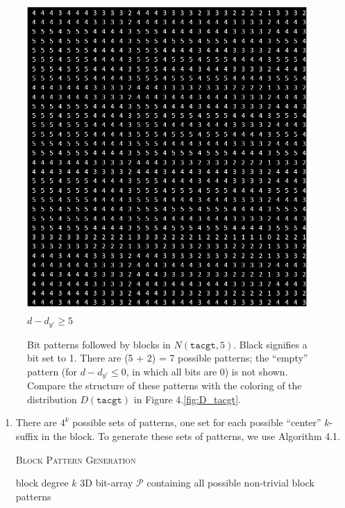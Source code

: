 \documentclass[oneside,12pt]{DISCSthesis}
\begin{document}
{\begin{figure}[h]
				\begin{minipage}{.33\textwidth} \centering \includegraphics[width=0.95\textwidth]{img/5} $d-d_{y'} \geq 5$ \end{minipage}
				\newline\newline
				\caption{
					Bit patterns followed by blocks in $N(\texttt{tacgt}, 5)$. Black signifies a bit set to 1. There are (5 + 2) = 7 possible patterns; the ``empty'' pattern (for $d - d_{y'} \leq 0$, in which all bits are 0) is not shown. Compare the structure of these patterns with the coloring of the distribution $D(\texttt{tacgt})$ in Figure 4.\ref{fig:D_tacgt}.
					}
			\end{figure}

		\begin{enumerate}
			\setcounter{enumi}{\theenumTemp}
			
			\item There are $4^k$ possible sets of patterns, one set for each possible ``center'' $k$-suffix in the block. To generate these sets of patterns, we use Algorithm 4.1.

			\bigskip\bigskip

			{
			\noindent \hspace*{6pt}{\bf Algorithm 4.1}
			\textsc{Block Pattern Generation}\small
			\begin{algorithmic}[1]\label{alg:block-pattern-gen}
				\Require block degree $k$
				\Ensure 3D bit-array $\mathcal{P}$ containing all possible non-trivial block patterns \vspace*{6pt}


\end{algorithmic}}
\end{enumerate}}
\end{document}
